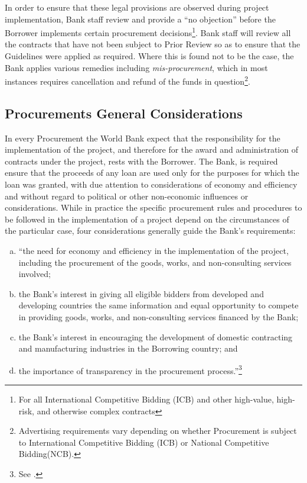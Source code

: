 In order to ensure that these legal provisions are observed during project implementation, Bank staff review and provide a ``no objection'' before the Borrower implements certain procurement decisions\footnote{For all International Competitive Bidding (ICB) and other high-value, high-risk, and otherwise complex contracts}. Bank staff will review all the contracts that have not been subject to Prior Review so as to ensure that the Guidelines were applied as required. Where this is found not to be the case, the Bank applies various remedies including \textit{mis-procurement}, which in most instances requires cancellation and refund of the funds in question\footnote{Advertising requirements vary depending on whether Procurement is subject to International Competitive Bidding (ICB) or National Competitive Bidding(NCB).}.


\subsection{Procurements General Considerations}

In every Procurement the World Bank expect that the responsibility for the implementation of the project, and therefore for the award and administration of contracts under the project, rests with the Borrower. The Bank, is required ensure that the proceeds of any loan are used only for the purposes for which the loan was granted, with due attention to considerations of economy and efficiency and without regard to political or other non-economic influences or considerations. While in practice the specific procurement rules and procedures to be followed in the implementation of a project depend on the circumstances of the particular case, four considerations generally guide the Bank's requirements:
\begin{enumerate}[a)]
\item ``the need for economy and efficiency in the implementation of the project, including the procurement of the goods, works, and non-consulting services involved;
\item the Bank's interest in giving all eligible bidders from developed and developing countries the same information and equal opportunity to compete in providing goods, works, and non-consulting services financed by the Bank;
\item  the Bank's interest in encouraging the development of domestic contracting and manufacturing industries in the Borrowing country; and
\item the importance of transparency in the procurement process.''\footnote{See \cite{wb_g_proc}.}
\end{enumerate}



